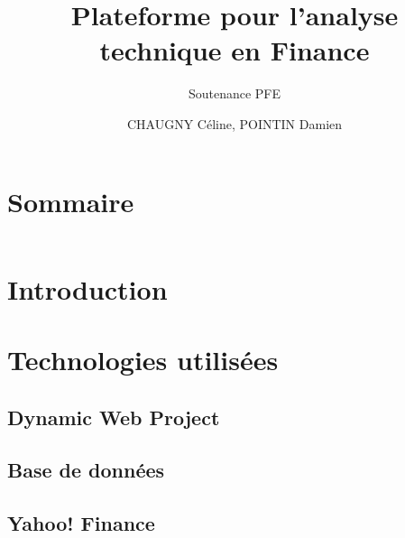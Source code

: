 \documentclass{beamer}
\title{Plateforme pour l'analyse technique en Finance}
\subtitle{Soutenance PFE}
\author{CHAUGNY Céline, POINTIN Damien}
\institute{Génie Mathématique | INSA Rouen}
\begin{document}
    \beamertemplatenavigationsymbolsempty

    \begin{frame}
        \titlepage{}
    \end{frame}

    \section*{Sommaire}
        \begin{frame}
            \begin{columns}[t]
  				\begin{column}{5cm}
  					\tableofcontents[sections={1-4},  hideothersubsections]
  				\end{column}
  				\begin{column}{5cm}
  				\tableofcontents[sections={5-9}, hideothersubsections]
  				\end{column}
  			\end{columns}
        \end{frame}

    \section{Introduction}
        \subsection{ }
            

    \section{Technologies utilisées}
         \subsection{Dynamic Web Project} %
         	
	        
	     \subsection{Base de données} %
	        
	            
	    \subsection{Yahoo! Finance} %
	        
	        
\end{document}
